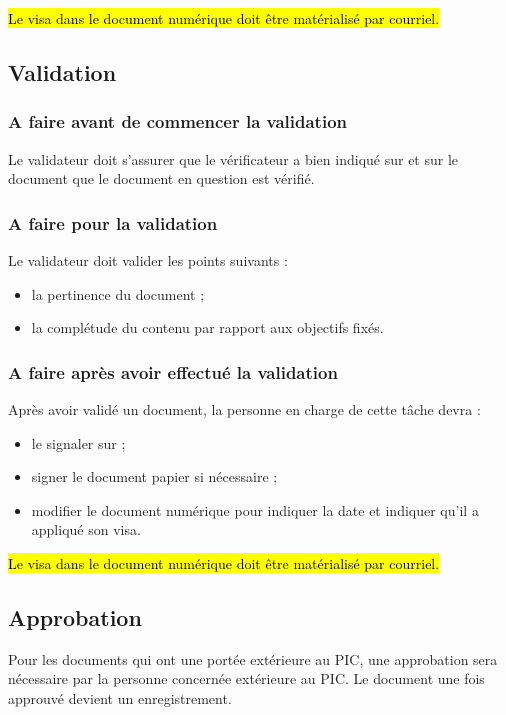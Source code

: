 \hl{Le visa dans le document numérique doit être matérialisé par courriel.}

\subsection{Validation}
\label{Validation}

\subsubsection*{A faire avant de commencer la validation}
Le validateur doit s'assurer que le vérificateur a bien indiqué sur \lintranet{} et sur le document que le document en question est vérifié.

\subsubsection*{A faire pour la validation}
Le validateur doit valider les points suivants :
\begin{itemize}
\item la pertinence du document ;
\item la complétude du contenu par rapport aux objectifs fixés.
\end{itemize}

\subsubsection*{A faire après avoir effectué la validation}
Après avoir validé un document, la personne en charge de cette tâche devra :
\begin{itemize}
\item le signaler sur \lintranet ;
\item signer le document papier si nécessaire ;
\item modifier le document numérique pour indiquer la date et indiquer qu'il a appliqué son
visa.
\end{itemize}

\hl{Le visa dans le document numérique doit être matérialisé par courriel. }


\subsection{Approbation}
\label{Approbation}

Pour les documents qui ont une portée extérieure au PIC, une approbation sera nécessaire par la personne concernée extérieure au PIC. Le document une fois approuvé devient un enregistrement.


